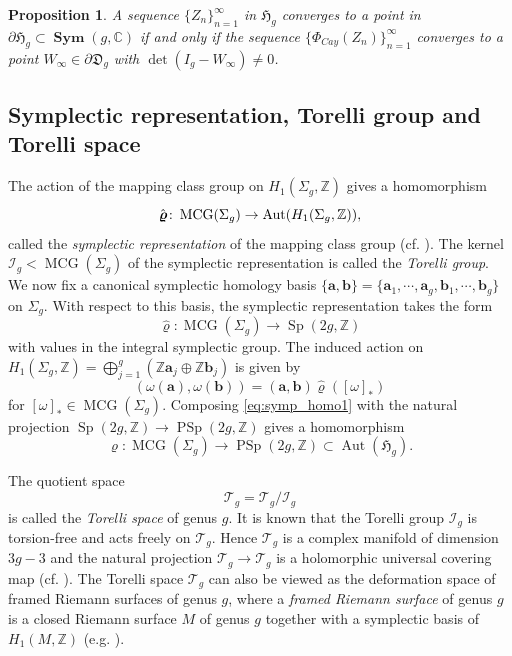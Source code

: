 \documentclass[dvipdfmx]{amsart}
\newtheorem{proposition}{Proposition}[section]
\theoremstyle{remark}
\newcommand{\teich}{\mathcal{T}}
\newcommand{\torelli}{\mathscr{T}}
\newcommand{\mcg}{\operatorname{MCG}}
\newcommand{\torelliG}{\mathcal{I}}
\newcommand{\syp}{\mathop{Sp}}
\newcommand{\psyp}{\mathop{PSp}}
\newcommand{\symm}{\mathop{\mathbf{Sym}}}
\newcommand{\symrep}{\mathop{\boldsymbol{\varrho}}}
\newcommand{\Cayley}{\Phi_{C\!a\!y}}
\begin{document}
\begin{proposition}
\label{prop:F-F-lemma3.1}
A sequence $\{Z_n\}_{n=1}^\infty$ in $\mathfrak{H}_g$ converges to a point in
$\partial \mathfrak{H}_g\subset \symm(g,\mathbb{C})$ if and only if the sequence
$\{\Cayley(Z_n)\}_{n=1}^\infty$ converges to a point
$W_\infty\in \partial \mathfrak{D}_g$ with $\det(I_g-W_\infty)\ne 0$.
\end{proposition}

\subsection{Symplectic representation, Torelli group and Torelli space}
\label{subsec:symplectic_representation}
The action of the mapping class group on $H_1(\Sigma_g,\mathbb{Z})$ gives a homomorphism
\[
\hat{\symrep}\colon \mcg(\Sigma_g)\to
{\rm Aut}(H_1(\Sigma_g,\mathbb Z)),
\]
called the \emph{symplectic representation} of the mapping class group (cf. \cite[Chapter Six]{FarbMargalit2012}). The kernel $\torelliG_g<\mcg(\Sigma_g)$ of the symplectic representation is called the \emph{Torelli group}. We now fix a canonical symplectic homology basis $\{\mathbf{a},\mathbf{b}\}=\{\mathbf{a}_1,\cdots,\mathbf{a}_g,\mathbf{b}_1,\cdots, \mathbf{b}_g\}$ on $\Sigma_g$. With respect to this basis, the symplectic representation takes the form
\begin{equation}
\label{eq:symp_homo1}
\hat{\symrep}\colon \mcg(\Sigma_{g})\to \syp(2g,\mathbb{Z})
\end{equation}
with values in the integral symplectic group. The induced action on $H_1(\Sigma_g,\mathbb{Z})=\bigoplus_{j=1}^g(\mathbb{Z}\mathbf{a}_j\oplus \mathbb{Z}\mathbf{b}_j)$ is given by
 \[
 (\omega(\mathbf{a}),\omega(\mathbf{b}))=(\mathbf{a},\mathbf{b}) \hat{\symrep}([\omega]_*)
 \]
 for $[\omega]_*\in \mcg(\Sigma_{g})$. Composing \eqref{eq:symp_homo1} with the natural projection $\syp(2g,\mathbb Z)\to\psyp(2g,\mathbb Z)$ gives a homomorphism
\begin{equation}
\label{eq:symp_homo2}
\symrep\colon \mcg(\Sigma_{g})\to \psyp(2g,\mathbb{Z})\subset \operatorname{Aut}(\mathfrak{H}_g).
\end{equation}

The quotient space
\[
\torelli_{g}=\teich_{g}/\torelliG_{g}
\]
is called the \emph{Torelli space} of genus $g$. It is known that the Torelli group $\torelliG_{g}$ is torsion-free and acts freely on $\teich_{g}$. Hence $\torelli_{g}$ is a complex manifold of dimension $3g-3$ and the natural projection $\teich_{g} \to \torelli_{g}$ is a holomorphic universal covering map (cf. \cite[Theorem 6.12]{FarbMargalit2012}).
The Torelli space $\torelli_{g}$ can also be viewed as the deformation space of framed Riemann surfaces of genus $g$, where a \emph{framed Riemann surface} of genus $g$ is a closed Riemann surface $M$ of genus $g$ together with a symplectic basis of $H_1(M,\mathbb{Z})$ (e.g. \cite[\S2]{Hain2006}).
\end{document}
